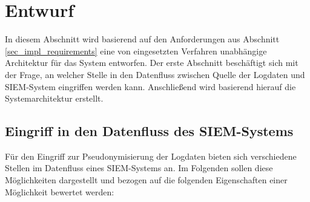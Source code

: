 \section{Entwurf}

\label{sec_impl_architecture}

In diesem Abschnitt wird basierend auf den Anforderungen aus Abschnitt \ref{sec_impl_requirements} eine von eingesetzten Verfahren unabhängige Architektur für das System entworfen. Der erste Abschnitt beschäftigt sich mit der Frage, an welcher Stelle in den Datenfluss zwischen Quelle der Logdaten und SIEM-System eingriffen werden kann. Anschließend wird basierend hierauf die Systemarchitektur erstellt.

\subsection{Eingriff in den Datenfluss des SIEM-Systems}

\label{sec_over_dataflow_siem}


Für den Eingriff zur Pseudonymisierung der Logdaten bieten sich verschiedene Stellen im Datenfluss eines SIEM-Systems an. Im Folgenden sollen diese Möglichkeiten dargestellt und bezogen auf die folgenden Eigenschaften einer Möglichkeit bewertet werden:


